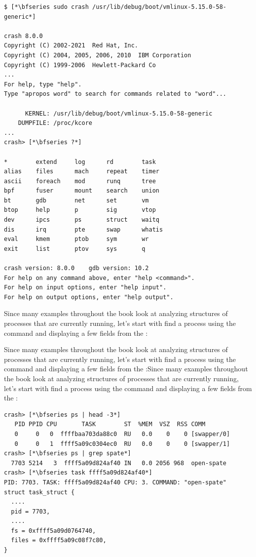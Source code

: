 \begin{lstlisting}
$ [*\bfseries sudo crash /usr/lib/debug/boot/vmlinux-5.15.0-58-generic*]

crash 8.0.0
Copyright (C) 2002-2021  Red Hat, Inc.
Copyright (C) 2004, 2005, 2006, 2010  IBM Corporation
Copyright (C) 1999-2006  Hewlett-Packard Co
...
For help, type "help".
Type "apropos word" to search for commands related to "word"...

      KERNEL: /usr/lib/debug/boot/vmlinux-5.15.0-58-generic
    DUMPFILE: /proc/kcore
...
crash> [*\bfseries ?*]

*        extend     log      rd        task                 
alias    files      mach     repeat    timer                
ascii    foreach    mod      runq      tree                 
bpf      fuser      mount    search    union                
bt       gdb        net      set       vm    
btop     help       p        sig       vtop                 
dev      ipcs       ps       struct    waitq                
dis      irq        pte      swap      whatis               
eval     kmem       ptob     sym       wr                   
exit     list       ptov     sys       q                    

crash version: 8.0.0    gdb version: 10.2
For help on any command above, enter "help <command>".
For help on input options, enter "help input".
For help on output options, enter "help output".
\end{lstlisting}

\noindent
Since many examples throughout the book look at analyzing structures of processes that are currently running, let's start with find a process using the  command and displaying a few fields from the :

Since many examples throughout the book look at analyzing structures of processes that are currently running, let's start with find a process using the  command and displaying a few fields from the :Since many examples throughout the book look at analyzing structures of processes that are currently running, let's start with find a process using the  command and displaying a few fields from the :

\begin{lstlisting}
crash> [*\bfseries ps | head -3*]
   PID PPID CPU       TASK        ST  %MEM  VSZ  RSS COMM
   0     0   0  ffffbaa703da88c0  RU   0.0    0    0 [swapper/0]
   0     0   1  ffff5a09c0304ec0  RU   0.0    0    0 [swapper/1]
crash> [*\bfseries ps | grep spate*]
  7703 5214   3  ffff5a09d824af40 IN   0.0 2056 968  open-spate
crash> [*\bfseries task ffff5a09d824af40*]
PID: 7703. TASK: ffff5a09d824af40 CPU: 3. COMMAND: "open-spate"
struct task_struct {
  ....
  pid = 7703,
  ....
  fs = 0xffff5a09d0764740,
  files = 0xffff5a09c08f7c80,
}
\end{lstlisting}

